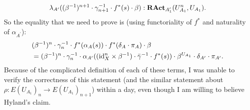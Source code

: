 \begin{remark}
  \[ \lambda_{A^\prime}((\beta^{-1})^{n + 1} \cdot \gamma_{n + 1}^{-1} \cdot f^*(s) \cdot \beta): \mathbf{RAct}_{A^\prime_1}(U_{A_1}^n, U_{A_1}). \]
  So the equality that we need to prove is (using functoriality of $ f^* $ and naturality of $ \alpha_{A^\prime} $):
  \begin{align*}
    &(\beta^{-1})^n \cdot \gamma_n^{-1} \cdot f^*(\alpha_A(s)) \cdot f^*(\delta_A \cdot \pi_A) \cdot \beta\\
    &= (\beta^{-1})^n \cdot \gamma_n^{-1} \cdot \alpha_{A^\prime}((\text{id}_{X}^n \times \beta^{-1}) \cdot \bar{\gamma}^{-1} \cdot f^*(s)) \cdot \beta^{U_{A_1}} \cdot \delta_{A^\prime} \cdot \pi_{A^\prime}.
  \end{align*}
  Because of the complicated definition of each of these terms, I was unable to verify the correctness of this statement (and the similar statement about $ \rho: E(U_{A_1})_n \to E(U_{A_1})_{n + 1} $) within a day, even though I am willing to believe Hyland's claim.
  \TODO






\end{remark}

